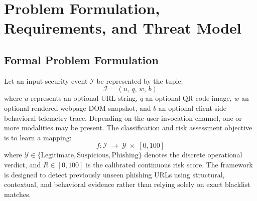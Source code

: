 \documentclass[conference]{IEEEtran}
\begin{document}
\section{Problem Formulation, Requirements, and Threat Model}

\subsection{Formal Problem Formulation}
Let an input security event $\mathcal{I}$ be represented by the tuple:
\begin{equation}
  \mathcal{I} = (u,\, q,\, w,\, b)
\end{equation}
where $u$ represents an optional URL string, $q$ an optional QR code image, $w$ an optional rendered
webpage DOM snapshot, and $b$ an optional client-side behavioral telemetry trace.
Depending on the user invocation channel, one or more modalities may be present.
The classification and risk assessment objective is to learn a mapping:
\begin{equation}
  f : \mathcal{I} \;\longrightarrow\; \mathcal{Y} \;\times\; [0, 100]
\end{equation}
where $\mathcal{Y} \in \{\text{Legitimate}, \text{Suspicious}, \text{Phishing}\}$ denotes the discrete
operational verdict, and $R \in [0, 100]$ is the calibrated continuous risk score.
The framework is designed to detect previously unseen phishing URLs using structural, contextual,
and behavioral evidence rather than relying solely on exact blacklist matches.
\end{document}
